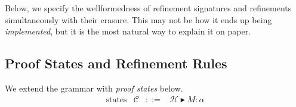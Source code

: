 \documentclass{article}
\newcommand\Ar[2]{[#1]#2}
\newcommand\TlNil{\cdot}
\newcommand\TlSnoc[3]{#1,#2:#3}
\newcommand\Ap[2]{#1[#2]}
\newcommand\WfSrt[2]{{#1}\vdash{#2}\;\textit{sort}}
\newcommand\WfTl[2]{{#1}\vdash{#2}\;\textit{tele}}
\newcommand\WfSp[3]{{#1}\vdash{#2}\Leftarrow{#3}}
\newcommand\HSubst[3]{[#1/#2]#3}
\begin{document}
Below, we specify the wellformedness of refinement signatures and
refinements simultaneously with their erasure. This may not be how it
ends up being \emph{implemented}, but it is the most natural way to
explain it on paper.


\subsection{Proof States and Refinement Rules}
\newcommand\State[3]{#1\blacktriangleright{#2}:{#3}}
\newcommand\WfState[3]{#1\mathrel{\vdash_{#2}}#3\;\textit{state}}

We extend the grammar with \emph{proof states} below.
\[
  \begin{array}{llll}
    \text{states}
    &\mathcal{C}
    &::=
    &\State{\mathcal{H}}{M}{\alpha}
  \end{array}
\]
\end{document}
